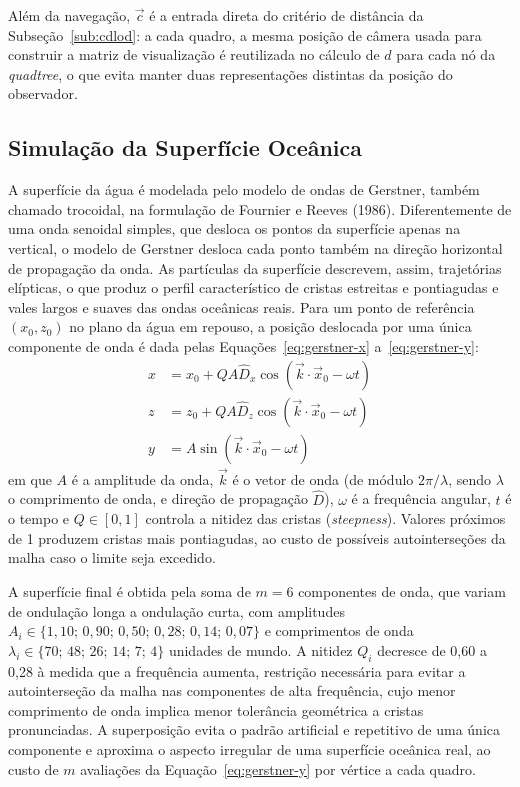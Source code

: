 \documentclass[conference]{IEEEtran}
\begin{document}
Além da navegação, $\vec{c}$ é a entrada direta do critério de distância da
Subseção~\ref{sub:cdlod}: a cada quadro, a mesma posição de câmera usada
para construir a matriz de visualização é reutilizada no cálculo de $d$ para
cada nó da \emph{quadtree}, o que evita manter duas representações
distintas da posição do observador.

\subsection{Simulação da Superfície Oceânica}
\label{sub:agua}

A superfície da água é modelada pelo modelo de ondas de Gerstner, também
chamado trocoidal, na formulação de Fournier e Reeves (1986). Diferentemente
de uma onda senoidal simples, que desloca os pontos da superfície apenas na
vertical, o modelo de Gerstner desloca cada ponto também na direção
horizontal de propagação da onda. As partículas da superfície descrevem,
assim, trajetórias elípticas, o que produz o perfil característico de
cristas estreitas e pontiagudas e vales largos e suaves das ondas oceânicas
reais. Para um ponto de referência $(x_0, z_0)$ no plano da água em repouso,
a posição deslocada por uma única componente de onda é dada pelas
Equações~\eqref{eq:gerstner-x} a~\eqref{eq:gerstner-y}:
\begin{align}
x &= x_0 + Q A \hat{D}_x \cos(\vec{k} \cdot \vec{x}_0 - \omega t) \label{eq:gerstner-x}\\
z &= z_0 + Q A \hat{D}_z \cos(\vec{k} \cdot \vec{x}_0 - \omega t) \label{eq:gerstner-z}\\
y &= A \sin(\vec{k} \cdot \vec{x}_0 - \omega t) \label{eq:gerstner-y}
\end{align}
em que $A$ é a amplitude da onda, $\vec{k}$ é o vetor de onda (de módulo
$2\pi/\lambda$, sendo $\lambda$ o comprimento de onda, e direção de
propagação $\hat{D}$), $\omega$ é a frequência angular, $t$ é o tempo e
$Q \in [0,1]$ controla a nitidez das cristas (\emph{steepness}). Valores
próximos de 1 produzem cristas mais pontiagudas, ao custo de possíveis
autointerseções da malha caso o limite seja excedido.

A superfície final é obtida pela soma de $m = 6$ componentes de onda, que
variam de ondulação longa a ondulação curta, com amplitudes
$A_i \in \{1{,}10;\, 0{,}90;\, 0{,}50;\, 0{,}28;\, 0{,}14;\, 0{,}07\}$ e
comprimentos de onda $\lambda_i \in \{70;\, 48;\, 26;\, 14;\, 7;\, 4\}$
unidades de mundo. A nitidez $Q_i$ decresce de 0,60 a 0,28 à medida que a
frequência aumenta, restrição necessária para evitar a autointerseção da
malha nas componentes de alta frequência, cujo menor comprimento de onda
implica menor tolerância geométrica a cristas pronunciadas. A superposição
evita o padrão artificial e repetitivo de uma única componente e aproxima o
aspecto irregular de uma superfície oceânica real, ao custo de $m$
avaliações da Equação~\eqref{eq:gerstner-y} por vértice a cada quadro.
\end{document}
